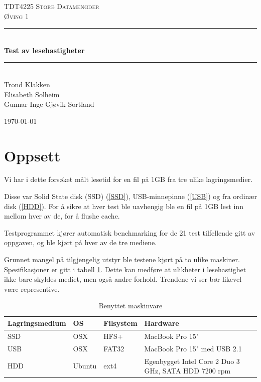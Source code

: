 \documentclass[titlepage]{article}
\newcommand{\HRule}{\rule{\linewidth}{0.5mm}}
\begin{document}
\begin{titlepage}
 
\begin{center}
 
\textsc{\LARGE TDT4225 Store Datamengder}\\[1.5cm]
\textsc{\Large Øving 1}\\[0.5cm]
 
\HRule \\[0.4cm]
{ \huge \bfseries Test av lesehastigheter}\\[0.4cm]
\HRule \\[1.5cm]

Trond Klakken \\
Elisabeth Solheim \\
Gunnar Inge Gjøvik Sortland

\vfill
 
{\large \today}
 
\end{center}

\end{titlepage}

\section{Oppsett}
Vi har i dette forsøket målt lesetid for en fil på 1GB fra tre ulike
lagringsmedier.

Disse var Solid State disk (SSD) (\ref{SSD}), USB-minnepinne
(\ref{USB}) og fra ordinær disk (\ref{HDD}). For å sikre at hver test
ble uavhengig ble en fil på 1GB lest inn mellom hver av de, for å
flushe cache.

Testprogrammet kjører automatisk benchmarking for de 21 test
tilfellende gitt av oppgaven, og ble kjørt på hver av de tre mediene.

Grunnet mangel på tilgjengelig utstyr ble testene kjørt på to ulike
maskiner. Spesifikasjoner er gitt i tabell \ref{tab:hardware}. Dette
kan medføre at ulikheter i lesehastighet ikke bare skyldes mediet, men
også andre forhold. Trendene vi ser bør likevel være representive.

\begin{table}[h!]
 \caption{Benyttet maskinvare}
 \label{tab:hardware}
  \centering
  \begin{tabular}{|l|l|l|l|}
\hline
\textbf{Lagringsmedium} & \textbf{OS} & Filsystem  & Hardware \\
\hline
\hline
SSD & OSX    & HFS+  & MacBook Pro 15" \\
USB & OSX    & FAT32 & MacBook Pro 15" med USB 2.1 \\
HDD & Ubuntu & ext4  & Egenbygget Intel Core 2 Duo 3 GHz, SATA HDD 7200 rpm \\

\hline
\end{tabular}
\end{table}
\end{document}

